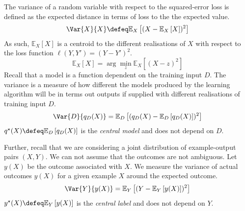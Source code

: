 \documentclass[
    a4paper, %
	fontsize=10pt, %
	twoside=false, %
]{kaobook}
\begin{document}

The variance of a random variable with respect to the squared-error loss is defined as the expected distance in terms of loss to the the expected value.
$$
\Var{X}{X} \defeq \mathbb{E}_{X}\left[ (X - \mathbb{E}_{X}\left[ X \right] )^2 \right]
$$
As such, $\mathbb{E}_{X}\left[ X \right]$ is a centroid to the different realisations of $X$ with respect to the loss function $\ell(Y, Y') = (Y-Y')^2$.
$$
\mathbb{E}_{X}\left[ X \right] = \arg\min _{z} \mathbb{E}_{X}\left[ (X-z)^2 \right] 
$$
Recall that a model is a function dependent on the training input $D$. The variance is a measure of how different the models produced by the learning algorithm will be in terms out outputs if supplied with different realisations of training input $D$.
$$
\Var{D}{q_{D}(X)} = \mathbb{E}_{D}\left[ (q_{D}(X) - \mathbb{E}_{D}\left[ q_{D}(X) \right] )^2 \right] 
$$
$q^\star(X) \defeq \mathbb{E}_{D}\left[ q_{D}(X) \right]$ is the \textit{central model} and does not depend on $D$.

Further, recall that we are considering a joint distribution of example-output pairs $(X,Y)$. We can not assume that the outcomes are not ambiguous. Let $y(X)$ be the outcome associated with $X$.
We measure the variance of actual outcomes $y(X)$ for a given example $X$ around the expected outcome.
$$
\Var{Y}{y(X)} = \mathbb{E}_{Y}\left[ (Y-\mathbb{E}_{Y}\left[ y(X) \right] )^2 \right] 
$$
$y^\star(X) \defeq \mathbb{E}_{Y}\left[ y(X) \right]$ is the \textit{central label} and does not depend on $Y$.


\end{document}
